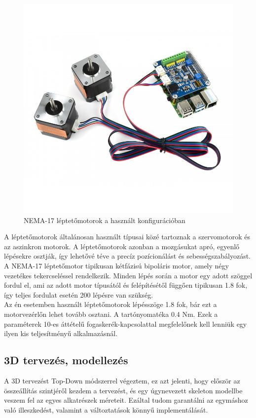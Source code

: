 \documentclass[12pt,a4paper]{article}
\begin{document}
\begin{figure}[h!]
	\centering
	\includegraphics[width=0.8\linewidth]{mech_stepper}
	\caption{NEMA-17 léptetőmotorok a használt konfigurációban \cite{stepperhat}}
	\label{fig:mech_stepper}
\end{figure}

A léptetőmotorok általánosan használt típusai közé tartoznak a szervomotorok és az aszinkron motorok. A léptetőmotorok azonban a mozgásukat apró, egyenlő lépésekre osztják, így lehetővé téve a precíz pozícionálást és sebességszabályozást. A NEMA-17 léptetőmotor tipikusan kétfázisú bipoláris motor, amely négy vezetékes tekercseléssel rendelkezik. Minden lépés során a motor egy adott szöggel fordul el, ami az adott motor típusától és felépítésétől függően tipikusan 1.8 fok, így teljes fordulat esetén 200 lépésre van szükség.\\

Az én esetemben használt léptetőmotorok lépésszöge 1.8 fok, bár ezt a motorvezérlőn lehet tovább osztani. A tartónyomatéka 0.4 Nm. Ezek a paraméterek 10-es áttételű fogaskerék-kapcsolattal megfelelőnek kell lenniük egy ilyen kis teljesítményű alkalmazásnál.

\pagebreak

\subsection{3D tervezés, modellezés}
A 3D tervezést Top-Down módszerrel végeztem, ez azt jelenti, hogy először az összeállítás szintjéről kezdem a tervezést, és egy úgynevezett skeleton modellbe veszem fel az egyes alkatrészek méreteit. Ezáltal tudom garantálni az egymáshoz való illeszkedést, valamint a változtatások könnyű implementálását.\\
\end{document}
